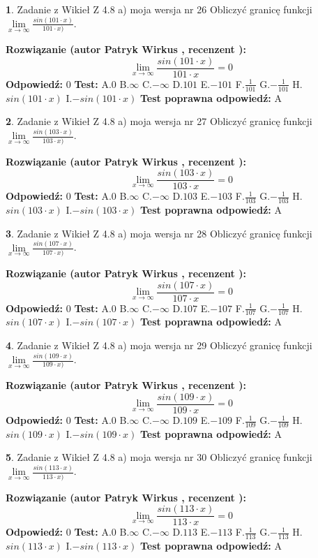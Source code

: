 \documentclass[12pt, a4paper]{article}
\theoremstyle{definition} %
\newtheorem{zad}{}
\newcommand{\zadStart}[1]{\begin{zad}#1\newline}
\newcommand{\zadStop}{\end{zad}}
\newcommand{\rozwStart}[2]{\noindent \textbf{Rozwiązanie (autor #1 , recenzent #2): }\newline}
\newcommand{\rozwStop}{\newline}
\newcommand{\odpStart}{\noindent \textbf{Odpowiedź:}\newline}
\newcommand{\odpStop}{\newline}
\newcommand{\testStart}{\noindent \textbf{Test:}\newline}
\newcommand{\testStop}{\newline}
\newcommand{\kluczStart}{\noindent \textbf{Test poprawna odpowiedź:}\newline}
\newcommand{\kluczStop}{\newline}
\begin{document}
\zadStart{Zadanie z Wikieł Z 4.8 a) moja wersja nr 26}
Obliczyć granicę funkcji $\lim\limits_{x\to \infty}\frac{sin(101\cdot x)}{101\cdot x)}$.
\zadStop
\rozwStart{Patryk Wirkus}{}
$$\lim\limits_{x\to \infty}\frac{sin(101\cdot x)}{101\cdot x}=
0$$
\rozwStop
\odpStart
$0$
\odpStop
\testStart
A.$0$ B.$\infty$ C.$-\infty$ D.$101$ E.$-101$
F.$\frac{1}{101}$ G.$-\frac{1}{101}$
H.$sin(101\cdot x)$
I.$-sin(101\cdot x)$
\testStop
\kluczStart
A
\kluczStop



\zadStart{Zadanie z Wikieł Z 4.8 a) moja wersja nr 27}
Obliczyć granicę funkcji $\lim\limits_{x\to \infty}\frac{sin(103\cdot x)}{103\cdot x)}$.
\zadStop
\rozwStart{Patryk Wirkus}{}
$$\lim\limits_{x\to \infty}\frac{sin(103\cdot x)}{103\cdot x}=
0$$
\rozwStop
\odpStart
$0$
\odpStop
\testStart
A.$0$ B.$\infty$ C.$-\infty$ D.$103$ E.$-103$
F.$\frac{1}{103}$ G.$-\frac{1}{103}$
H.$sin(103\cdot x)$
I.$-sin(103\cdot x)$
\testStop
\kluczStart
A
\kluczStop



\zadStart{Zadanie z Wikieł Z 4.8 a) moja wersja nr 28}
Obliczyć granicę funkcji $\lim\limits_{x\to \infty}\frac{sin(107\cdot x)}{107\cdot x)}$.
\zadStop
\rozwStart{Patryk Wirkus}{}
$$\lim\limits_{x\to \infty}\frac{sin(107\cdot x)}{107\cdot x}=
0$$
\rozwStop
\odpStart
$0$
\odpStop
\testStart
A.$0$ B.$\infty$ C.$-\infty$ D.$107$ E.$-107$
F.$\frac{1}{107}$ G.$-\frac{1}{107}$
H.$sin(107\cdot x)$
I.$-sin(107\cdot x)$
\testStop
\kluczStart
A
\kluczStop



\zadStart{Zadanie z Wikieł Z 4.8 a) moja wersja nr 29}
Obliczyć granicę funkcji $\lim\limits_{x\to \infty}\frac{sin(109\cdot x)}{109\cdot x)}$.
\zadStop
\rozwStart{Patryk Wirkus}{}
$$\lim\limits_{x\to \infty}\frac{sin(109\cdot x)}{109\cdot x}=
0$$
\rozwStop
\odpStart
$0$
\odpStop
\testStart
A.$0$ B.$\infty$ C.$-\infty$ D.$109$ E.$-109$
F.$\frac{1}{109}$ G.$-\frac{1}{109}$
H.$sin(109\cdot x)$
I.$-sin(109\cdot x)$
\testStop
\kluczStart
A
\kluczStop



\zadStart{Zadanie z Wikieł Z 4.8 a) moja wersja nr 30}
Obliczyć granicę funkcji $\lim\limits_{x\to \infty}\frac{sin(113\cdot x)}{113\cdot x)}$.
\zadStop
\rozwStart{Patryk Wirkus}{}
$$\lim\limits_{x\to \infty}\frac{sin(113\cdot x)}{113\cdot x}=
0$$
\rozwStop
\odpStart
$0$
\odpStop
\testStart
A.$0$ B.$\infty$ C.$-\infty$ D.$113$ E.$-113$
F.$\frac{1}{113}$ G.$-\frac{1}{113}$
H.$sin(113\cdot x)$
I.$-sin(113\cdot x)$
\testStop
\kluczStart
A
\kluczStop
\end{document}
